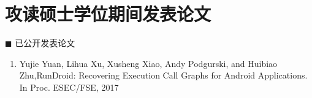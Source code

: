 \section*{攻读硕士学位期间发表论文}

\vskip 5mm

{\heiti $\blacksquare$ 已公开发表论文}\vskip 5mm

\begin{enumerate}

  \item Yujie Yuan, Lihua Xu, Xusheng Xiao, Andy Podgurski, and Huibiao Zhu,RunDroid: Recovering Execution Call Graphs for Android Applications. In Proc. ESEC/FSE, 2017
\end{enumerate}


